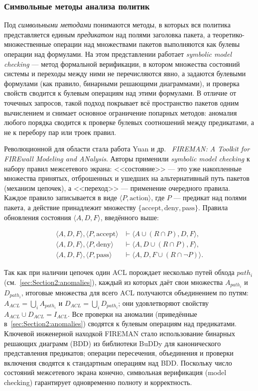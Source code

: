 \subsubsection{Символьные методы анализа политик}
\label{sec:Section2:symbolic}

Под \emph{символьными методами} понимаются методы, в которых вся политика представляется единым \emph{предикатом} над полями заголовка пакета, а теоретико-множественные операции над множествами пакетов выполняются как булевы операции над формулами. На этом представлении работает \emph{symbolic model checking} --- метод формальной верификации, в котором множества состояний системы и переходы между ними не перечисляются явно, а задаются булевыми формулами (как правило, бинарными решающими диаграммами), и проверка свойств сводится к булевым операциям над этими формулами. В отличие от точечных запросов, такой подход покрывает всё пространство пакетов одним вычислением и снимает основное ограничение попарных методов: аномалия любого порядка сводится к проверке булевых соотношений между предикатами, а не к перебору пар или троек правил.

Революционной для области стала работа Yuan и др.~\cite{yuan2006fireman} \emph{FIREMAN: A Toolkit for FIREwall Modeling and ANalysis}. Авторы применили \emph{symbolic model checking} к набору правил межсетевого экрана: <<состояние>> --- это уже накопленные множества принятых, отброшенных и ушедших на альтернативный путь пакетов (механизм цепочек), а <<переход>> --- применение очередного правила. Каждое правило записывается в виде $\langle P, \text{action}\rangle$, где $P$ --- предикат над полями пакета, а действие принадлежит множеству $\{\text{accept},\text{deny},\text{pass}\}$. Правила обновления состояния $\langle A,D,F\rangle$, введённого выше:

\begin{align*}
\langle A,D,F\rangle, \langle P,\text{accept}\rangle &\vdash \langle A \cup (R \cap P), D, F\rangle, \\
\langle A,D,F\rangle, \langle P,\text{deny}\rangle &\vdash \langle A, D \cup (R \cap P), F\rangle, \\
\langle A,D,F\rangle, \langle P,\text{pass}\rangle &\vdash \langle A, D, F \cup (R \cap \neg P)\rangle.
\end{align*}

Так как при наличии цепочек один ACL порождает несколько путей обхода $path_i$ (см.~\ref{sec:Section2:anomalies}), каждый из которых даёт свои множества $A_{path_i}$ и $D_{path_i}$, итоговые множества для всего ACL получаются объединением по путям: $A_{ACL} = \bigcup_i A_{path_i}$ и $D_{ACL} = \bigcup_i D_{path_i}$; они удовлетворяют свойству $A_{ACL} \cup D_{ACL} = I_{ACL}$. Все проверки на аномалии (приведённые в~\ref{sec:Section2:anomalies}) сводятся к булевым операциям над предикатами. Ключевой инженерной находкой FIREMAN стало использование бинарных решающих диаграмм (BDD) из библиотеки BuDDy для канонического представления предикатов; операции пересечения, объединения и проверки включения сводятся к стандартным операциям над BDD. Поскольку число состояний межсетевого экрана конечно, символьная верификация (model checking) гарантирует одновременно полноту и корректность.

